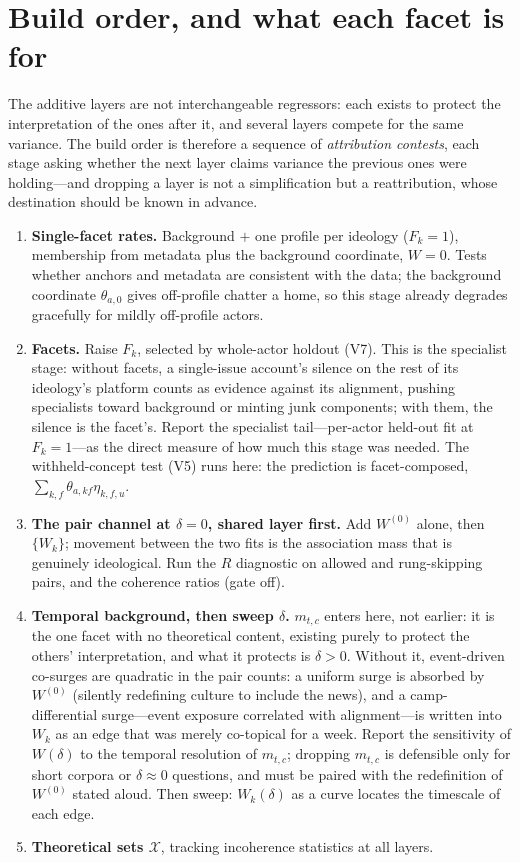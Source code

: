\documentclass[11pt]{article}
\newcommand{\Xcal}{\mathcal{X}}
\newcommand{\1}{\mathbb{1}}
\begin{document}
\section{Build order, and what each facet is for}\label{sec:build}

The additive layers are not interchangeable regressors: each exists to protect the interpretation of the ones after it, and several layers compete for the same variance. The build order is therefore a sequence of \emph{attribution contests}, each stage asking whether the next layer claims variance the previous ones were holding---and dropping a layer is not a simplification but a reattribution, whose destination should be known in advance.

\begin{enumerate}
  \item \textbf{Single-facet rates.} Background $+$ one profile per ideology ($F_k=1$), membership from metadata plus the background coordinate, $W=0$. Tests whether anchors and metadata are consistent with the data; the background coordinate $\theta_{a,0}$ gives off-profile chatter a home, so this stage already degrades gracefully for mildly off-profile actors.
  \item \textbf{Facets.} Raise $F_k$, selected by whole-actor holdout (V7). This is the specialist stage: without facets, a single-issue account's silence on the rest of its ideology's platform counts as evidence against its alignment, pushing specialists toward background or minting junk components; with them, the silence is the facet's. Report the specialist tail---per-actor held-out fit at $F_k=1$---as the direct measure of how much this stage was needed. The withheld-concept test (V5) runs here: the prediction is facet-composed, $\sum_{k,f}\theta_{a,kf}\eta_{k,f,u}$.
  \item \textbf{The pair channel at $\delta=0$, shared layer first.} Add $W^{(0)}$ alone, then $\{W_k\}$; movement between the two fits is the association mass that is genuinely ideological. Run the $R$ diagnostic on allowed and rung-skipping pairs, and the coherence ratios (gate off).
  \item \textbf{Temporal background, then sweep $\delta$.} $m_{t,c}$ enters here, not earlier: it is the one facet with no theoretical content, existing purely to protect the others' interpretation, and what it protects is $\delta>0$. Without it, event-driven co-surges are quadratic in the pair counts: a uniform surge is absorbed by $W^{(0)}$ (silently redefining culture to include the news), and a camp-differential surge---event exposure correlated with alignment---is written into $W_k$ as an edge that was merely co-topical for a week. Report the sensitivity of $W(\delta)$ to the temporal resolution of $m_{t,c}$; dropping $m_{t,c}$ is defensible only for short corpora or $\delta\approx0$ questions, and must be paired with the redefinition of $W^{(0)}$ stated aloud. Then sweep: $W_k(\delta)$ as a curve locates the timescale of each edge.
  \item \textbf{Theoretical sets $\Xcal$}, tracking incoherence statistics at all layers.
\end{enumerate}
\end{document}
